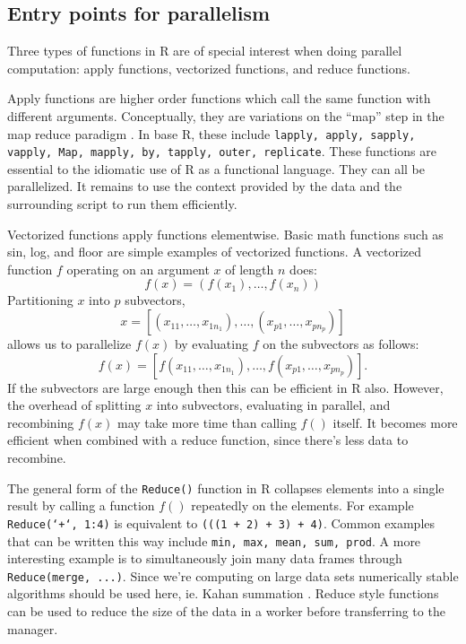 \documentclass[12pt]{article}
\begin{document}
\subsection{Entry points for parallelism}

\label{sec:parallel_points}

Three types of functions in R are of special interest when doing parallel
computation: apply functions, vectorized functions, and reduce functions.

Apply functions are higher order functions which call the same function
with different arguments. Conceptually, they are variations on the ``map''
step in the map reduce paradigm \cite{dean2008mapreduce}.  In base R, these
include \texttt{lapply, apply, sapply, vapply, Map, mapply, by, tapply,
outer, replicate}. These functions are essential to the idiomatic use of R
as a functional language. They can all be parallelized. It remains to use
the context provided by the data and the surrounding script to run
them efficiently. 

Vectorized functions apply functions elementwise. Basic math functions such
as sin, log, and floor are simple examples of vectorized functions.  A
vectorized function $f$ operating on an argument $x$ of length $n$ does:
\begin{equation}
\label{eq:vectorization}
    f(x) = (f(x_1), \dots, f(x_n))
\end{equation}
Partitioning $x$ into $p$ subvectors, 
\[
    x = \left[ (x_{11}, \dots, x_{1 n_1}), \dots, (x_{p 1}, \dots, x_{p
n_p}) \right]
\]
allows us to parallelize $f(x)$ by evaluating $f$ on the subvectors as follows:
\[
    f(x) = \left[ f(x_{11}, \dots, x_{1 n_1}), \dots, f(x_{p 1}, \dots, x_{p
n_p}) \right].
\]
If the subvectors are large enough then this can be efficient in R also.
However, the overhead of splitting $x$ into subvectors, evaluating in
parallel, and recombining $f(x)$ may take more time than calling $f()$
itself. It becomes more efficient when combined with a reduce function,
since there's less data to recombine.

The general form of the \texttt{Reduce()} function in R collapses elements
into a single result by calling a function $f()$ repeatedly on the
elements. For example \texttt{Reduce(`+`, 1:4)} is equivalent to
\texttt{(((1 + 2) + 3) + 4)}. Common examples that can be written this way
include \texttt{min, max, mean, sum, prod}. A more interesting example is
to simultaneously join many data frames through \texttt{Reduce(merge,
...)}.  Since we're computing on large data sets numerically stable
algorithms should be used here, ie.  Kahan summation \cite{Robey2011217}.
Reduce style functions can be used to reduce the size of the data in a
worker before transferring to the manager.
\end{document}
